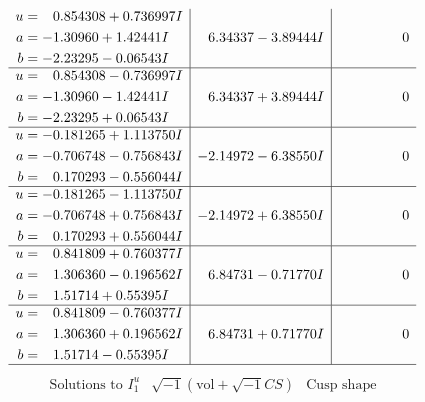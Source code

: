 \documentclass[1p]{elsarticle_modified}
\theoremstyle{definition}
\newcommand{\I}{\sqrt{-1}}
\begin{document}
$$\begin{array}{c|c|c}
\begin{aligned}
u &= \phantom{-}0.854308 + 0.736997 I \\
a &= -1.30960 + 1.42441 I \\
b &= -2.23295 - 0.06543 I\end{aligned}
 & \phantom{-}6.34337 - 3.89444 I & \phantom{-0.000000 } 0 \\ \hline\begin{aligned}
u &= \phantom{-}0.854308 - 0.736997 I \\
a &= -1.30960 - 1.42441 I \\
b &= -2.23295 + 0.06543 I\end{aligned}
 & \phantom{-}6.34337 + 3.89444 I & \phantom{-0.000000 } 0 \\ \hline\begin{aligned}
u &= -0.181265 + 1.113750 I \\
a &= -0.706748 - 0.756843 I \\
b &= \phantom{-}0.170293 - 0.556044 I\end{aligned}
 & -2.14972 - 6.38550 I & \phantom{-0.000000 } 0 \\ \hline\begin{aligned}
u &= -0.181265 - 1.113750 I \\
a &= -0.706748 + 0.756843 I \\
b &= \phantom{-}0.170293 + 0.556044 I\end{aligned}
 & -2.14972 + 6.38550 I & \phantom{-0.000000 } 0 \\ \hline\begin{aligned}
u &= \phantom{-}0.841809 + 0.760377 I \\
a &= \phantom{-}1.306360 - 0.196562 I \\
b &= \phantom{-}1.51714 + 0.55395 I\end{aligned}
 & \phantom{-}6.84731 - 0.71770 I & \phantom{-0.000000 } 0 \\ \hline\begin{aligned}
u &= \phantom{-}0.841809 - 0.760377 I \\
a &= \phantom{-}1.306360 + 0.196562 I \\
b &= \phantom{-}1.51714 - 0.55395 I\end{aligned}
 & \phantom{-}6.84731 + 0.71770 I & \phantom{-0.000000 } 0\\
 \hline 
 \end{array}$$\newpage$$\begin{array}{c|c|c}  
\text{Solutions to }I^u_{1}& \I (\text{vol} + \sqrt{-1}CS) & \text{Cusp shape}\\
 \hline 
\begin{aligned}

\end{aligned}
\end{array}$$
\end{document}
